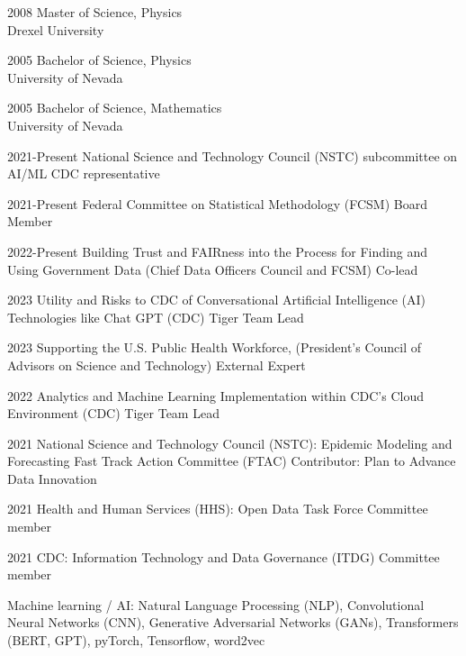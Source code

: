 \documentclass[]{scrartcl}
\begin{document}
\begin{cleanCV}
\WorkExperience
{2008}
{Master of Science, Physics}
{\\Drexel University}

\WorkExperience
{2005}
{Bachelor of Science, Physics}
{\\University of Nevada}

\WorkExperience
{2005}
{Bachelor of Science, Mathematics}
{\\University of Nevada}


\WorkExperienceX
{2021-Present}
{National Science and Technology Council (NSTC) subcommittee on AI/ML}
{CDC representative}

\WorkExperienceX
{2021-Present}
{Federal Committee on Statistical Methodology (FCSM)}
{Board Member}

\WorkExperienceX
{2022-Present}
{Building Trust and FAIRness into the Process  for Finding and Using Government Data (Chief Data Officers Council and FCSM)}
{Co-lead}

\WorkExperienceX
{2023}
{Utility and Risks to CDC of Conversational Artificial Intelligence (AI) Technologies like Chat GPT (CDC)}
{Tiger Team Lead}

\WorkExperienceX
{2023}
{Supporting the U.S. Public Health Workforce, (President's Council of Advisors on Science and Technology)}
{External Expert}



\WorkExperienceX
{2022}
{Analytics and Machine Learning Implementation within CDC's Cloud Environment (CDC)}
{Tiger Team Lead}

\WorkExperienceX
{2021}
{National Science and Technology Council (NSTC): Epidemic Modeling and Forecasting Fast Track Action Committee (FTAC)}
{Contributor: Plan to Advance Data Innovation}

\WorkExperienceX
{2021}
{Health and Human Services (HHS): Open Data Task Force}
{Committee member}

\WorkExperienceX
{2021}
{CDC: Information Technology and Data Governance (ITDG)}
{Committee member}


\newpage


\WorkExperience
{ }
{Machine learning / AI: }
{Natural Language Processing (NLP), Convolutional Neural Networks (CNN), Generative Adversarial Networks (GANs), Transformers (BERT, GPT), pyTorch, Tensorflow, word2vec}


\end{cleanCV}
\end{document}
